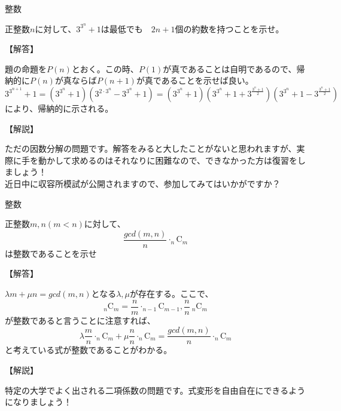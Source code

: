 \documentclass[a4paper,fleqn,dvipdfmx]{jsarticle}
\begin{document}
\newpage


\begin{itembox}[l]{整数}

    正整数$n$に対して、$3^{3^n}+1$は最低でも　$2n+1$個の約数を持つことを示せ。

\end{itembox}


\begin{flushleft}
【解答】
\end{flushleft}

    題の命題を$P(n)$とおく。この時、$P(1)$が真であることは自明であるので、帰納的に$P(n)$が真ならば$P(n+1)$が真であることを示せば良い。
    $$3^{3^{n+1}}+1=(3^{3^n}+1)(3^{2\cdot 3^n}-3^{3^n}+1)=(3^{3^n}+1)(3^{3^n}+1+3^{\frac{3^n+1}{2}})(3^{3^n}+1-3^{\frac{3^n+1}{2}})$$
    により、帰納的に示される。


\begin{flushleft}
【解説】
\end{flushleft}

ただの因数分解の問題です。解答をみると大したことがないと思われますが、実際に手を動かして求めるのはそれなりに困難なので、できなかった方は復習をしましょう！\\
近日中に収容所模試が公開されますので、参加してみてはいかがですか？



\newpage


\begin{itembox}[l]{整数}

    正整数$m,n(m<n)$に対して、
    $$\frac{gcd(m,n)}{n}\cdot _n\text{C}_m$$
    は整数であることを示せ
    
\end{itembox}


\begin{flushleft}
【解答】
\end{flushleft}

    $\lambda m + \mu n =gcd(m,n)$となる$\lambda , \mu$が存在する。ここで、
    $$ _{n}\text{C}_{m}=\frac{n}{m} \cdot_{n-1}\text{C}_{m-1},\frac{n}{n}\ _{n}\text{C}_{m}$$
    が整数であると言うことに注意すれば、
    $$\displaystyle\lambda \frac{m}{n}\cdot_{n}\text{C}_{m} + \mu\frac{n}{n} \cdot_{n}\text{C}_{m} =\frac{gcd(m,n)}{n}\cdot _n\text{C}_m$$
    と考えている式が整数であることがわかる。


\begin{flushleft}
【解説】
\end{flushleft}

特定の大学でよく出される二項係数の問題です。式変形を自由自在にできるようになりましょう！
\end{document}
